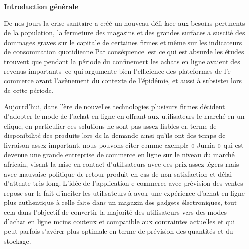 \documentclass[a4paper,12pt]{report}
\begin{document}
\newpage
{}
\begin{doublespace}
\begin{center}
\vspace*{1cm}

\textbf{\huge{Introduction générale}}

\end{center}
\end{doublespace}
\begin{doublespace}
\renewcommand{\headrulewidth}{1pt}
\fancyhead[L]{\hspace*{5cm}}
De nos jours la crise sanitaire a créé un nouveau défi face aux besoins pertinents de la population, la fermeture des magazins et des grandes surfaces a suscité des dommages graves sur le capitale de certaines firmes et même sur les indicateurs de consommation quotidienne.Par conséquence, est ce qui est absurde les études trouvent que pendant la période du confinement les achats en ligne avaient des revenus importants, ce qui argumente bien l'efficience des plateformes de l'e-commerce avant l'avènement du contexte de l'épidémie, et aussi à subsister lors de cette période. 

Aujourd’hui, dans l’ère de nouvelles technologies plusieurs firmes décident d'adopter le mode de l'achat en ligne en offrant aux utilisateurs le marché en un clique, en particulier ces solutions ne sont pas assez fiables en terme de disponibilité  des produits lors de la demande ainsi qu'ils ont des temps de livraison assez important, nous pouvons citer comme exemple « Jumia » qui est devenue une grande entreprise de commerce en ligne sur le niveau du marché africain, visant la mise en contact d'utilisateurs avec des prix assez légers mais avec mauvaise  politique de retour produit en cas de non satisfaction et délai d'attente très long. 
L'idée de l'application e-commerce avec prévision des ventes  repose sur le fait d’inciter les utilisateurs à avoir une expérience d'achat en ligne plus authentique à celle faite dans un magazin des gadgets électroniques, tout cela dans l’objectif de convertir la majorité des utilisateurs vers des modes d'achat en ligne  moins couteux et compatible aux contraintes actuelles et qui peut parfois s’avérer plus optimale en terme de prévision des quantités et du stockage.
 

\end{doublespace}
\end{document}
